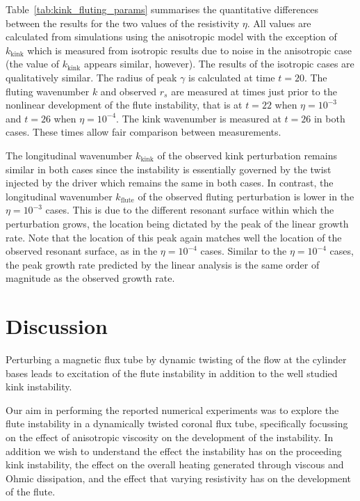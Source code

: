 \documentclass[fleqn,usenatbib]{mnras}
\newcommand{\rev}[1]{{\color{red} {#1}}}
\begin{document}
Table~\ref{tab:kink_fluting_params} summarises the quantitative differences
between the results for the two values of the resistivity $\eta$. All values
are calculated from simulations using the anisotropic model with the exception
of $k_{\text{kink}}$ which is measured from isotropic results due to noise in
the anisotropic case (the value of $k_{\text{kink}}$ appears similar, however).
The results of the isotropic cases are qualitatively similar. The radius of
peak $\gamma$ is calculated at time $t=20$. The fluting wavenumber $k$ and
observed $r_s$ are measured at times just prior to the nonlinear development of
the flute instability, that is at $t=22$ when $\eta=10^{-3}$ and $t=26$ when
$\eta = 10^{-4}$. The kink wavenumber is measured at $t=26$ in both cases.
These times allow fair comparison between measurements.

The longitudinal wavenumber $k_{\text{kink}}$ of the observed kink perturbation
remains similar in both cases since the instability is essentially governed by
the twist injected by the driver which remains the same in both cases. In
contrast, the longitudinal wavenumber $k_{\text{flute}}$ of the observed
fluting perturbation is lower in the $\eta=10^{-3}$ cases. This is due to the
different resonant surface within which the perturbation grows, the location
being dictated by the peak of the linear growth rate. Note that the location of
this peak again matches well the location of the observed resonant surface, as
in the $\eta=10^{-4}$ cases. Similar to the $\eta=10^{-4}$ cases, the peak
growth rate predicted by the linear analysis is the same order of magnitude as
the observed growth rate.

\section{Discussion}
\label{sec-discussion}

\rev{Perturbing a magnetic flux tube by dynamic twisting of the flow
at the cylinder bases leads to excitation of the flute instability in
addition to the well studied kink instability.}

\rev{Our aim in performing the reported numerical experiments was to explore
the flute instability in a dynamically twisted coronal flux tube, specifically
focussing on the effect of anisotropic viscosity on the development of the
instability. In addition we wish to understand the effect the instability has
on the proceeding kink instability, the effect on the overall heating generated
through viscous and Ohmic dissipation, and the effect that varying resistivity
has on the development of the flute.}
\end{document}
